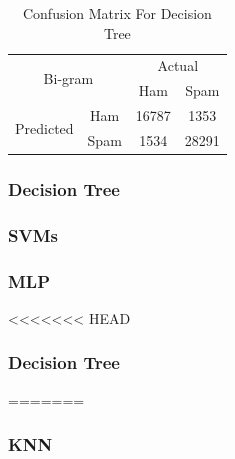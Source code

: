 \documentclass[12pt]{article}
\begin{document}
\begin{table}[H]
\begin{floatrow}
{\begin{subtable}{.5\textwidth}
				\begin{tabular}{@{}|c|c|c|c|@{}}
					\toprule
					\multicolumn{2}{|c|}{\multirow{2}{*}{Bi-gram}} & \multicolumn{2}{c|}{Actual} \\ \cmidrule(l){3-4} 
					\multicolumn{2}{|c|}{}                        & Ham          & Spam         \\ \midrule
					\multirow{2}{*}{Predicted}       & Ham        & 16787        & 1353         \\ \cmidrule(l){2-4} 
					& Spam       & 1534         & 28291        \\ \bottomrule
				\end{tabular}
			\end{subtable}
		}{  
			\caption{Confusion Matrix For Decision Tree}  
			\label{Confusion_DT}  
		}  
	\end{floatrow}
\end{table} 


\subsubsection{Decision Tree}


\subsubsection{SVMs}

\subsubsection{MLP}
<<<<<<< HEAD

\subsubsection{Decision Tree}

=======

\subsubsection{KNN}

\end{document}

